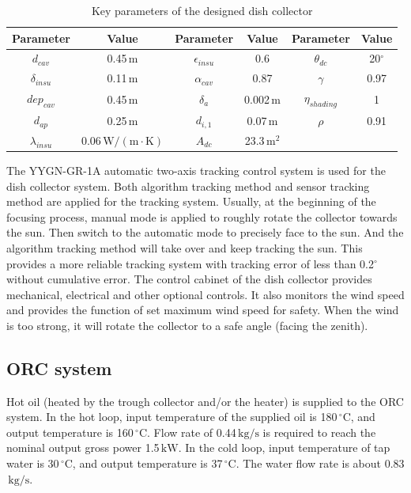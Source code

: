 \begin{table}[htbp]
	\caption{Key parameters of the designed dish collector}
	\begin{center}
	\begin{tabular}{cccccc}
		\toprule
		Parameter		&	Value	&	Parameter		&	Value	&	Parameter		&	Value\\
		\midrule
		$d_{cav}$	&	0.45$\,\mathrm{m}$	&	$\epsilon_{insu}$	&	0.6	&	$\theta_{dc}$	&	20$^\circ$\\
		$\delta_{insu}$	&	0.11$\,\mathrm{m}$	&	$\alpha_{cav}$	&	0.87	&	$\gamma$	&	0.97\\
		$dep_{cav}$	&	0.45$\,\mathrm{m}$	&	$\delta_a$		&	0.002$\,\mathrm{m}$	&	$\eta_{shading}$	&	1\\
		$d_{ap}$	&	0.25$\,\mathrm{m}$	&	$d_{i,1}$	&	0.07$\,\mathrm{m}$	&	$\rho$	&	0.91\\
		$\lambda_{insu}$	&	0.06$\,\mathrm{W/(m\cdot K)}$	&	$A_{dc}$	&	23.3$\,\mathrm{m^2}$	&	\\		
		\bottomrule
	\end{tabular}
	\end{center}
	\label{tab:ddc}
\end{table}

The YYGN-GR-1A automatic two-axis tracking control system is used for the dish collector system. Both algorithm tracking method and sensor tracking method are applied for the tracking system. Usually, at the beginning of the focusing process, manual mode is applied to roughly rotate the collector towards the sun. Then switch to the automatic mode to precisely face to the sun. And the algorithm tracking method will take over and keep tracking the sun. This provides a more reliable tracking system with tracking error of less than 0.2$^\circ$ without cumulative error.
The control cabinet of the dish collector provides mechanical, electrical and other optional controls. It also monitors the wind speed and provides the function of set maximum wind speed for safety. When the wind is too strong, it will rotate the collector to a safe angle (facing the zenith).

\subsection{ORC system}
Hot oil (heated by the trough collector and/or the heater) is supplied to the ORC system. 
In the hot loop, input temperature of the supplied oil is 180$\,^\circ$C, and output temperature is 160$\,^\circ$C. Flow rate of 0.44$\,\mathrm{kg/s}$ is required to reach the nominal output gross power 1.5$\,\mathrm{kW}$. In the cold loop, input temperature of tap water is 30$\,^\circ$C, and output temperature is 37$\,^\circ$C. The water flow rate is about 0.83$\,\mathrm{kg/s}$.

